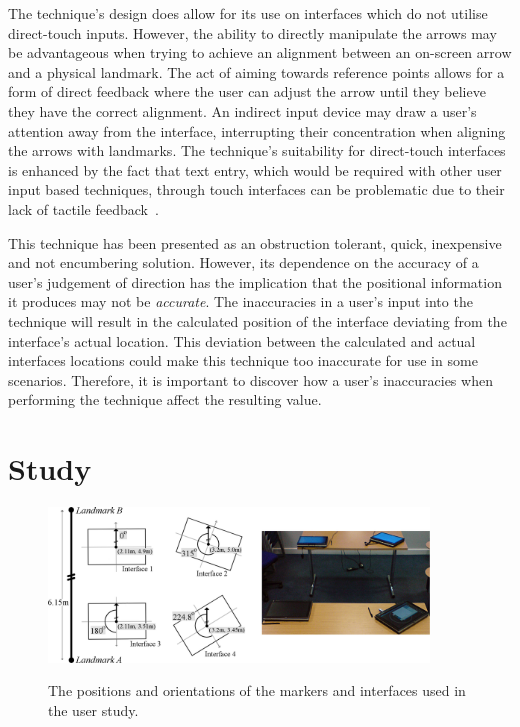 \documentclass{bmcart}
\begin{document}
The technique's design does allow for its use on interfaces which do not utilise direct-touch inputs.
However, the ability to directly manipulate the arrows may be advantageous when trying to achieve an alignment between an on-screen arrow and a physical landmark. 
The act of aiming towards reference points allows for a form of direct feedback where the user can adjust the arrow until they believe they have the correct alignment.  
An indirect input device may draw a user's attention away from the interface, interrupting their concentration when aligning the arrows with landmarks.
The technique's suitability for direct-touch interfaces is enhanced by the fact that text entry, which would be required with other user input based techniques, through touch interfaces can be problematic due to their lack of tactile feedback~\cite{Weiss2009}.

This technique has been presented as an obstruction tolerant, quick, inexpensive and not encumbering solution.
However, its dependence on the accuracy of a user's judgement of direction has the implication that the positional information it produces may not be {\emph{accurate}}.
The inaccuracies in a user's input into the technique will result in the calculated position of the interface deviating from the interface's actual location.
This deviation between the calculated and actual interfaces locations could make this technique too inaccurate for use in some scenarios.
Therefore, it is important to discover how a user's inaccuracies when performing the technique affect the resulting value.

\section*{Study}\label{sec:study}

\begin{figure}[ht]
  \centering
   \caption{The positions and orientations of the markers and interfaces used in the user study.}
  \includegraphics[width=0.9\textwidth]{figures/studyLayout.png}
   \label{fig:room}
\end{figure}
\end{document}

